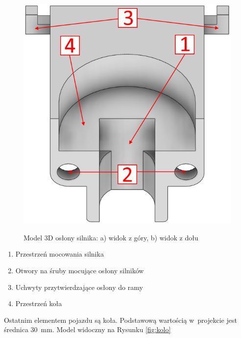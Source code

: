 \begin{figure}[!h]
{      \includegraphics[scale=0.35]{images/Model3D_Oslona_2.png}
      \label{fig:oslonasilnikowspod}
    }
    \caption{Model 3D osłony silnika: a) widok z góry, b) widok z dołu}
    \label{fig:oslonasilnikow}
\end{figure}

\begin{enumerate}
    \item Przestrzeń mocowania silnika
    \item Otwory na śruby mocujące osłony silników
    \item Uchwyty przytwierdzające osłony do ramy
    \item Przestrzeń koła
\end{enumerate}

Ostatnim elementem pojazdu są koła. Podstawową wartością w~projekcie jest średnica 30~mm. Model widoczny na Rysunku \ref{fig:kolo}

